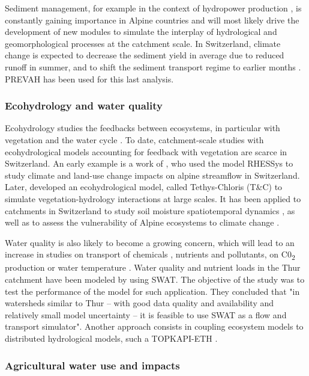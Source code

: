 \documentclass[10pt,a4paper]{article}
\begin{document}
Sediment management, for example in the context of hydropower production \citep{RaymondPralong2015,Gabbud2016}, is constantly gaining importance in Alpine countries and will most likely drive the development of new modules to simulate the interplay of hydrological and geomorphological processes at the catchment scale. In Switzerland, climate change is expected to decrease the sediment yield in average due to reduced runoff in summer, and to shift the sediment transport regime to earlier months \citep{RaymondPralong2015}. PREVAH has been used for this last analysis.


\subsubsection{Ecohydrology and water quality}
\label{sec:application:ecohydrology}

Ecohydrology studies the feedbacks between ecosystems, in particular with vegetation and the water cycle \citep{tague200}. To date, catchment-scale studies with ecohydrological models accounting for feedback with vegetation are scarce in Switzerland. An early example is a work of \citet{zierl05}, who used the model RHESSys to study climate and land-use change impacts on alpine streamflow in Switzerland. Later, \citet{Fatichi2012,Fatichi2012a} developed an ecohydrological model, called Tethys-Chloris (T\&C) to simulate vegetation-hydrology interactions at large scales. It has been applied to catchments in Switzerland to study soil moisture spatiotemporal dynamics \citep{Fatichi2015a}, as well as to assess the vulnerability of Alpine ecosystems to climate change \citep{Mastrotheodoros2019}.

Water quality is also likely to become a growing concern, which will lead to an increase in studies on transport of chemicals \citep{queloz2015}, nutrients and pollutants, on C0\textsubscript{2} production or water temperature \citep{michel2020}. Water quality and nutrient loads in the Thur catchment have been modeled by \citet{Abbaspour2007} using SWAT. The objective of the study was to test the performance of the model for such application. They concluded that "in watersheds similar to Thur – with good data quality and availability and relatively small model uncertainty – it is feasible to use SWAT as a flow and transport simulator". Another approach consists in coupling ecosystem models to distributed hydrological models, such a TOPKAPI-ETH \citep{Pappas2015}.


\subsubsection{Agricultural water use and impacts}
\label{sec:application:agriculture}
\end{document}
